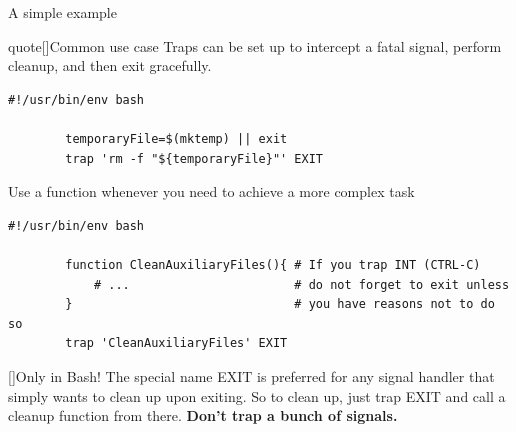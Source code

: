 \begin{frame}[fragile]{A simple example}
    \vspace{-4mm}
    \begin{varblock}{quote}[\textwidth]{Common use case}
        \normalsize\textnormal{Traps can be set up to intercept a fatal signal, perform cleanup, and then exit gracefully.}
    \end{varblock}
    \begin{lstlisting}[style=MyBash, emph={[7]temporaryFile}, belowskip=-5mm]
        #!/usr/bin/env bash

        temporaryFile=$(mktemp) || exit
        trap 'rm -f "${temporaryFile}"' EXIT
    \end{lstlisting}
    Use a function whenever you need to achieve a more complex task
    \begin{lstlisting}[style=MyBash, emph={[7]temporaryFile}, aboveskip=2mm, belowskip=-6mm, xleftmargin=2mm, xrightmargin=3mm, firstnumber=5]
        #!/usr/bin/env bash

        function CleanAuxiliaryFiles(){ # If you trap INT (CTRL-C)
            # ...                       # do not forget to exit unless
        }                               # you have reasons not to do so
        trap 'CleanAuxiliaryFiles' EXIT
    \end{lstlisting}
    \small
    \begin{varblock}{}[\textwidth]{Only in Bash!}
        The special name EXIT is preferred for any signal handler that simply wants to clean up upon exiting.
        So to clean up, just trap EXIT and call a cleanup function from there. \textbf{Don't trap a bunch of signals.}
    \end{varblock}
\end{frame}
